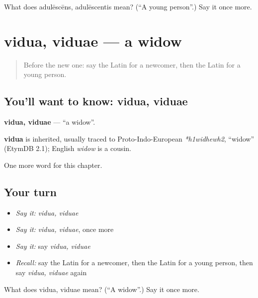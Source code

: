 \begin{tcolorbox}[breakable,colback=teal!4,colframe=teal!35!black,title={Before you move on}]
What does adulēscēns, adulēscentis mean? (\textquotedblleft{}A young person\textquotedblright{}.) Say it once more.
\end{tcolorbox}
\section[vidua, viduae]{vidua, viduae — a widow}

\label{lesson:LA-C220-vidua}



\begin{quote}
Before the new one: say the Latin for a newcomer, then the Latin for a young person.
\end{quote}

\subsection*{You'll want to know: vidua, viduae}
\textbf{vidua, viduae} — \textquotedblleft{}a widow\textquotedblright{}.

\begin{cousinweb}
\textbf{vidua} is inherited, usually traced to Proto-Indo-European \emph{*h1widhewh2}, \textquotedblleft{}widow\textquotedblright{} (EtymDB 2.1); English \emph{widow} is a cousin.
\end{cousinweb}

\begin{grammarlens}[title={What you've built}]
One more word for this chapter.
\end{grammarlens}

\subsection*{Your turn}
\begin{itemize}
\raggedright
  \item \emph{Say it:} \emph{vidua, viduae}
  \item \emph{Say it:} \emph{vidua, viduae}, once more
  \item \emph{Say it:} say \emph{vidua, viduae}
  \item \emph{Recall:} say the Latin for a newcomer, then the Latin for a young person, then say \emph{vidua, viduae} again
\end{itemize}

\begin{tcolorbox}[breakable,colback=teal!4,colframe=teal!35!black,title={Before you move on}]
What does vidua, viduae mean? (\textquotedblleft{}A widow\textquotedblright{}.) Say it once more.
\end{tcolorbox}

